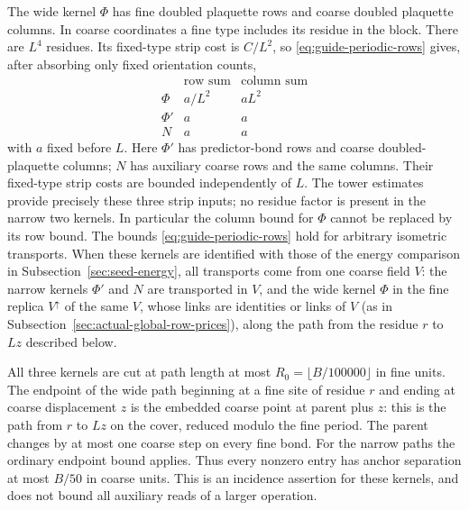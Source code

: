 The wide kernel $\Phi$ has fine doubled plaquette rows and
coarse doubled plaquette columns. In coarse coordinates a fine type
includes its residue in the block. There are $L^4$ residues. Its
fixed-type strip cost is $C/L^2$, so
\eqref{eq:guide-periodic-rows} gives, after absorbing only fixed
orientation counts,
\begin{equation}\label{eq:guide-allowance}
 \begin{array}{c|cc}
 &\text{row sum}&\text{column sum}\\ \hline
 \Phi&a/L^2&aL^2\\
 \Phi'&a&a\\
 N&a&a
 \end{array}
\end{equation}
with $a$ fixed before $L$. Here $\Phi'$ has predictor-bond rows and coarse doubled-plaquette
columns; $N$ has auxiliary coarse rows and the same columns. Their fixed-type strip costs are bounded
independently of $L$. The tower estimates provide precisely these
three strip inputs; no residue factor is present in the narrow two
kernels. In particular the column bound for $\Phi$ cannot be replaced
by its row bound. The bounds \eqref{eq:guide-periodic-rows} hold for
arbitrary isometric transports. When these kernels are identified with
those of the energy comparison in Subsection~\ref{sec:seed-energy}, all
transports come from one coarse field $V$: the narrow kernels $\Phi'$
and $N$ are transported in $V$, and the wide kernel $\Phi$ in the fine
replica $V^\uparrow$ of the same $V$, whose links are identities or
links of $V$ (as in Subsection~\ref{sec:actual-global-row-prices}), along
the path from the residue $r$ to $Lz$ described below.

All three kernels are cut at path length at most
$R_0=\lfloor B/100000\rfloor$ in fine units. The endpoint of the
wide path beginning at a fine site of residue $r$ and ending at
coarse displacement $z$ is the embedded coarse point at parent plus
$z$: this is the path from $r$ to $Lz$ on the cover, reduced modulo
the fine period. The parent changes by at most one coarse step on
every fine bond. For the narrow paths the ordinary endpoint bound
applies. Thus every nonzero entry has anchor separation at most
$B/50$ in coarse units. This is an incidence assertion for these
kernels, and does not bound all auxiliary reads of a larger operation.

